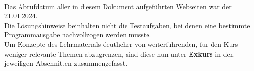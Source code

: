\Hinweise

\paragraph*{}

Das Abrufdatum aller in diesem Dokument aufgeführten Webseiten war der 21.01.2024.\\

Die Lösungshinweise beinhalten nicht die Testaufgaben, bei denen eine bestimmte Programmausgabe nachvollzogen werden musste.\\

Um Konzepte des Lehrmaterials deutlicher von weiterführenden, für den Kurs weniger relevante Themen abzugrenzen, sind diese nun unter \textbf{Exkurs} in den jeweiligen Abschnitten zusammengefasst.